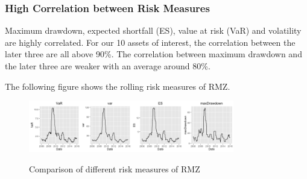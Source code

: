 \documentclass{beamer}
\newcommand\Fontviii{\fontsize{8}{9.2}\selectfont}
\begin{document}

\begin{frame}
\frametitle{High Correlation between Risk Measures}
\Fontviii

Maximum drawdown, expected shortfall (ES), value at risk (VaR) and volatility are highly correlated. For our 10 assets of interest, the correlation between the later three are all above 90\%. The correlation between maximum drawdown and the later three are weaker with an average around 80\%. \par
The following figure shows the rolling risk measures of RMZ.


\begin{figure}[h]
\centering 
\includegraphics[width = 0.8\textwidth]{../results/risk_measure_RMZ}
\label{fig: risk_meausre_RMZ}
\caption{Comparison of different risk measures of RMZ} 
\end{figure}

\end{frame}

\end{document}
